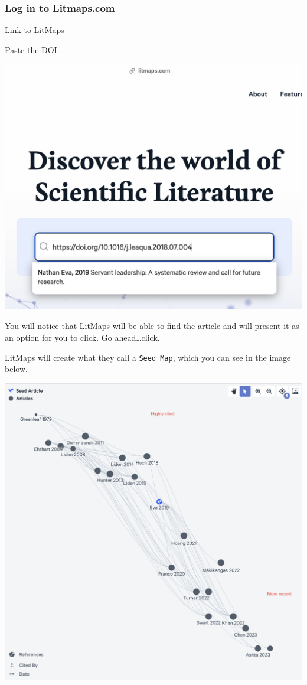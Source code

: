 \documentclass[
]{book}
\theoremstyle{definition}
\theoremstyle{definition}
\theoremstyle{definition}
\theoremstyle{definition}
\theoremstyle{remark}
\begin{document}
\hypertarget{log-in-to-litmaps.com}{%
\subsubsection*{Log in to Litmaps.com}\label{log-in-to-litmaps.com}}

\href{https://litmaps.com}{Link to LitMaps}

Paste the DOI.

\includegraphics{assets/u2/litmaps1.png}

You will notice that LitMaps will be able to find the article and will present it as an option for you to click. Go ahead\ldots click.

LitMaps will create what they call a \texttt{Seed\ Map}, which you can see in the image below.

\includegraphics{assets/u2/litmaps2.png}
\end{document}
